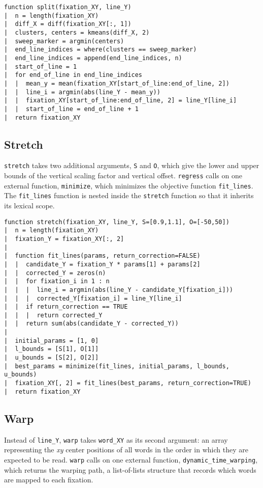 \documentclass[doc,biblatex]{apa7}
\begin{document}
\begin{verbatim}
function split(fixation_XY, line_Y)
|  n = length(fixation_XY)
|  diff_X = diff(fixation_XY[:, 1])
|  clusters, centers = kmeans(diff_X, 2)
|  sweep_marker = argmin(centers)
|  end_line_indices = where(clusters == sweep_marker)
|  end_line_indices = append(end_line_indices, n)
|  start_of_line = 1
|  for end_of_line in end_line_indices
|  |  mean_y = mean(fixation_XY[start_of_line:end_of_line, 2])
|  |  line_i = argmin(abs(line_Y - mean_y))
|  |  fixation_XY[start_of_line:end_of_line, 2] = line_Y[line_i]
|  |  start_of_line = end_of_line + 1
|  return fixation_XY
\end{verbatim}

\subsection{Stretch}

\noindent
\texttt{stretch} takes two additional arguments, \texttt{S} and \texttt{O}, which give the lower and upper bounds of the vertical scaling factor and vertical offset. \texttt{regress} calls on one external function, \texttt{minimize}, which minimizes the objective function \texttt{fit\_lines}. The \texttt{fit\_lines} function is nested inside the \texttt{stretch} function so that it inherits its lexical scope.

\begin{verbatim}
function stretch(fixation_XY, line_Y, S=[0.9,1.1], O=[-50,50])
|  n = length(fixation_XY)
|  fixation_Y = fixation_XY[:, 2]
|
|  function fit_lines(params, return_correction=FALSE)
|  |  candidate_Y = fixation_Y * params[1] + params[2]
|  |  corrected_Y = zeros(n)
|  |  for fixation_i in 1 : n
|  |  |  line_i = argmin(abs(line_Y - candidate_Y[fixation_i]))
|  |  |  corrected_Y[fixation_i] = line_Y[line_i]
|  |  if return_correction == TRUE
|  |  |  return corrected_Y
|  |  return sum(abs(candidate_Y - corrected_Y))
|
|  initial_params = [1, 0]
|  l_bounds = [S[1], O[1]]
|  u_bounds = [S[2], O[2]]
|  best_params = minimize(fit_lines, initial_params, l_bounds, u_bounds)
|  fixation_XY[, 2] = fit_lines(best_params, return_correction=TRUE)
|  return fixation_XY
\end{verbatim}

\subsection{Warp}

\noindent
Instead of \texttt{line\_Y}, \texttt{warp} takes \texttt{word\_XY} as its second argument: an array representing the \textit{xy} center positions of all words in the order in which they are expected to be read. \texttt{warp} calls on one external function, \texttt{dynamic\_time\_warping}, which returns the warping path, a list-of-lists structure that records which words are mapped to each fixation.
\end{document}
